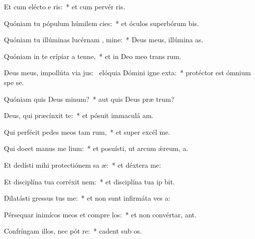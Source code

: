 \item Et cum elécto e ris:~* et cum pervér ris.
\item Quóniam tu pópulum húmilem  cies:~* et óculos superbórum bis.
\item Quóniam tu illúminas lucérnam , mine:~* Deus meus, illúmina  as.
\item Quóniam in te erípiar a tenne,~* et in Deo meo trans rum.
\item Deus meus, impollúta via jus:~\pscross{} elóquia Dómini igne exta:~* protéctor est ómnium spe  se.
\item Quóniam quis Deus  minum?~* aut quis Deus præ  trum?
\item Deus, qui præcínxit  te:~* et pósuit immaculá  am.
\item Qui perfécit pedes meos tam rum,~* et super excél  me.
\item Qui docet manus me  lium:~* et posuísti, ut arcum ǽreum,  a.
\item Et dedísti mihi protectiónem sa æ:~* et déxtera   me:
\item Et disciplína tua corréxit   nem:~* et disciplína tua ip  bit.
\item Dilatásti gressus  tus me:~* et non sunt infirmáta ves a:
\item Pérsequar inimícos meos et compre los:~* et non convértar,  ant.
\item Confríngam illos, nec pót re:~* cadent sub  os.
